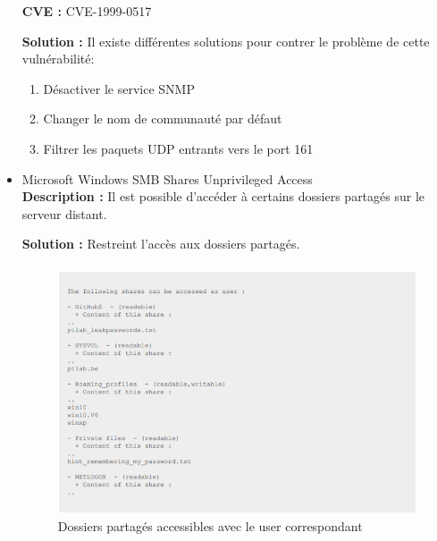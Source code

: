 \documentclass[french,paper=a4,oneside,captions=tableheading]{article}
\begin{document}
\begin{itemize}
\textbf{CVE :}
CVE-1999-0517

\textbf{Solution :}
Il existe différentes solutions pour contrer le problème de cette vulnérabilité:
\begin{enumerate}
    \item Désactiver le service SNMP
    \item Changer le nom de communauté par défaut
    \item Filtrer les paquets UDP entrants vers le port 161
\end{enumerate}

    \item Microsoft Windows SMB Shares Unprivileged Access \\
\textbf{Description :}
Il est possible d'accéder à certains dossiers partagés sur le serveur distant.

\textbf{Solution :}
Restreint l'accès aux dossiers partagés. \\

\begin{figure}[H]
    \centering
    \includegraphics[width=11cm]{images/sharefolder.png}
    \caption{Dossiers partagés accessibles avec le user correspondant}
    \label{fig:sharefolder}
\end{figure}

\end{itemize}
\end{document}
